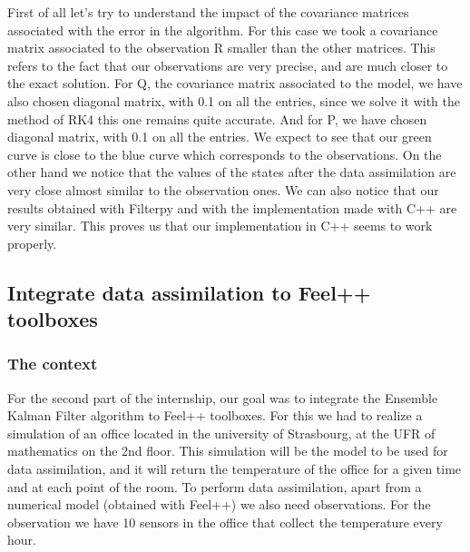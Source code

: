 \noindent
First of all let's try to understand the impact of the covariance matrices associated with the error in the algorithm. For this  case we took a covariance matrix associated to the observation R smaller than the other matrices. This refers to the fact that our observations are very precise, and are much closer to the exact solution. For Q, the covariance matrix associated to the model, we have also chosen diagonal matrix, with 0.1 on all the entries, since we solve it with the method of RK4 this one remains quite accurate. And for P,  we have chosen  diagonal matrix, with 0.1 on all the entries.
\newline
\noindent We expect to see that our green curve is close to the blue curve which corresponds to the observations. On the other hand we notice that the values of the states after the data assimilation are very close almost similar to the observation ones.
\newline \noindent We can also notice that our results obtained with Filterpy and with the implementation made with C++ are very similar. This proves us that our implementation in C++ seems to work properly.


\newpage
\subsection{Integrate data assimilation to Feel++ toolboxes}
\subsubsection{The context}
\noindent For the second part of the internship, our goal was to integrate the Ensemble Kalman Filter algorithm to Feel++ toolboxes. For this we had to realize a simulation of an office located in the university of Strasbourg, at the UFR of mathematics on the 2nd floor. This simulation will be the model to be used for data assimilation, and it will return the temperature of the office for a given time and at each point of the room. 
\newline \noindent To perform data assimilation, apart from a numerical model (obtained with Feel++) we also need observations. For the observation we have 10 sensors in the office that collect the temperature every hour. 

